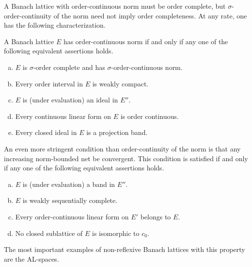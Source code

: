 A Banach lattice with order-continuous norm must be order complete, but $ \sigma $-order-continuity of the norm need not imply order completeness.
At any rate, one has the following characterization.

A Banach lattice $ E $ has order-continuous norm if and only if any one of the following equivalent assertions holds.
\begin{enumerate}[(a)]
	\item 
	$ E $ is $ \sigma $-order complete and has $ \sigma $-order-continuous norm.

	\item 
	Every order interval in $ E $ is weakly compact.

	\item 
	$ E $ is (under evaluation) an ideal in $ E'' $.

	\item 
	Every continuous linear form on $ E $ is order continuous.

	\item 
	Every closed ideal in $ E $ is a projection band.

\end{enumerate}
An even more stringent condition than order-continuity of the norm is that any increasing norm-bounded net be convergent.
This condition is satisfied if and only if any one of the following equivalent assertions holds.
\begin{enumerate}[(a)]

    \item 
    $ E $ is (under evaluation) a band in $ E'' $.
    
    \item 
    $ E $ is weakly sequentially complete.
    
    \item 
    Every order-continuous linear form on $ E' $ belongs to $ E $.
    
    \item 
    No closed sublattice of $ E $ is isomorphic to $ c_{0} $.

\end{enumerate}
The most important examples of non-reflexive Banach lattices with this property are the AL-spaces.
